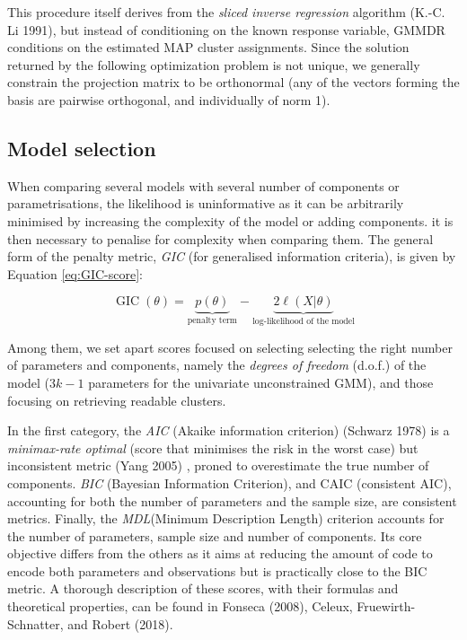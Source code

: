 This procedure itself derives from the \emph{sliced inverse regression} algorithm (K.-C. Li 1991), but instead of conditioning on the known response variable, GMMDR conditions on the estimated MAP cluster assignments. Since the solution returned by the following optimization problem is not unique, we generally constrain the projection matrix to be orthonormal (any of the vectors forming the basis are pairwise orthogonal, and individually of norm 1).

\hypertarget{model-selection}{%
\subsection{Model selection}\label{model-selection}}

When comparing several models with several number of components or
parametrisations, the likelihood is uninformative as it can be
arbitrarily minimised by increasing the complexity of the model or
adding components. it is then necessary to penalise for complexity when
comparing them. The general form of the penalty metric, \emph{GIC} (for
generalised information criteria), is given by Equation
\eqref{eq:GIC-score}:

\begin{equation}
    \operatorname{GIC} (\theta) =  \underbrace{p(\theta)}_{\text{penalty term}} - \underbrace{2 \ell (X | \theta)}_{\text{log-likelihood of the model}}
\label{eq:GIC-score}
\end{equation}

Among them, we set apart scores focused on selecting selecting the right
number of parameters and components, namely the \emph{degrees of freedom}
(d.o.f.) of the model (\(3k-1\) parameters for the univariate
unconstrained GMM), and those focusing on retrieving readable clusters.

In the first category, the \emph{AIC} (Akaike information criterion)
(Schwarz 1978) is a \emph{minimax-rate optimal} (score that minimises the risk
in the worst case) but inconsistent metric (Yang 2005) , proned to
overestimate the true number of components. \emph{BIC} (Bayesian Information
Criterion), and CAIC (consistent AIC), accounting for both the number of
parameters and the sample size, are consistent metrics. Finally, the
\emph{MDL}(Minimum Description Length) criterion accounts for the number of
parameters, sample size and number of components. Its core objective
differs from the others as it aims at reducing the amount of code to
encode both parameters and observations but is practically close to the
BIC metric. A thorough description of these scores, with their formulas
and theoretical properties, can be found in Fonseca (2008), Celeux, Fruewirth-Schnatter, and Robert (2018).

